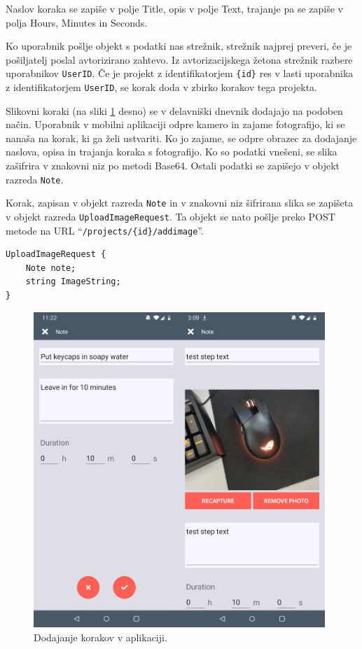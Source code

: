 \documentclass[a4paper, 12pt]{book}
\begin{document}
Naslov koraka se zapiše v polje Title, opis v polje Text, trajanje pa se zapiše v polja Hours, Minutes in Seconds.

Ko uporabnik pošlje objekt s podatki nas strežnik, strežnik najprej preveri, če je pošiljatelj poslal avtorizirano zahtevo.
Iz avtorizacijskega žetona strežnik razbere uporabnikov \texttt{UserID}. 
Če je projekt z identifikatorjem \texttt{\{id\}} res v lasti uporabnika z identifikatorjem \texttt{UserID}, se korak doda v zbirko korakov tega projekta.

Slikovni koraki (na sliki \ref{note_image} desno) se v delavniški dnevnik dodajajo na podoben način.
Uporabnik v mobilni aplikaciji odpre kamero in zajame fotografijo, ki se nanaša na korak, ki ga želi ustvariti.
Ko jo zajame, se odpre obrazec za dodajanje naslova, opisa in trajanja koraka s fotografijo.
Ko so podatki vnešeni, se slika zašifrira v znakovni niz po metodi Base64.
Ostali podatki se zapišejo v objekt razreda \texttt{Note}.

Korak, zapisan v objekt razreda \texttt{Note} in v znakovni niz šifrirana slika se zapišeta v objekt razreda \texttt{UploadImageRequest}.
Ta objekt se nato pošlje preko POST metode na URL \enquote{\texttt{/projects/\{id\}/addimage}}.

\begin{verbatim}
UploadImageRequest { 
    Note note; 
    string ImageString; 
}
\end{verbatim}

\begin{figure}[H]
\begin{center}
\includegraphics[width=11cm]{app_note_image}
\end{center}
	\caption{Dodajanje korakov v aplikaciji.}
\label{note_image}
\end{figure}
\end{document}
